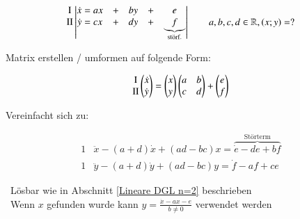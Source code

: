 \newcommand{\RomanNumeralCaps}[1]
{\MakeUppercase{\romannumeral #1}}

\vspace{-0.2cm}

$$
\begin{matrix}
    \text{\RomanNumeralCaps{1}}\\
    \text{\RomanNumeralCaps{2}}\\
    \text{}
\end{matrix}	
\left| \begin{matrix}
    \dot{x} = ax & + & by & + & e \\
    \dot{y} = cx & + & dy & + &\underbrace{f}_{\text{störf.}} 
\end{matrix}
\right| \qquad a, b, c, d \in \mathbb{R} , (x; y) = ? $$


Matrix erstellen / umformen auf folgende Form:

$$ \begin{matrix}
    \text{\RomanNumeralCaps{1}}\\
    \text{\RomanNumeralCaps{2}}
\end{matrix}
\left(
\begin{matrix}
    \dot{x}\\
    \dot{y}
\end{matrix}
\right)
= 
\left(
\begin{matrix}
    x\\
    y
\end{matrix}
\right)
\left(
\begin{matrix}
    a & b \\
    c & d
\end{matrix}
\right)
+ 
\left(
\begin{matrix}
    e\\
    f
\end{matrix}
\right)
$$


Vereinfacht sich zu:

\vspace{-0.4cm}

\begin{align*}
    1 & \ddot{x} - (a+d)\dot{x} + (ad-bc)x = \overbrace{\dot{e}-de+bf}^{\text{Störterm}}  \\
    1 & \ddot{y} - (a+d)\dot{y} + (ad-bc)y = \dot{f} - af + ce
\end{align*}

\textrightarrow\ Lösbar wie in Abschnitt \ref*{Lineare DGL n=2} beschrieben \\
\textrightarrow\ Wenn $x$ gefunden wurde kann $y = \frac{\dot{x}- ax-e}{b \neq 0}$ verwendet werden